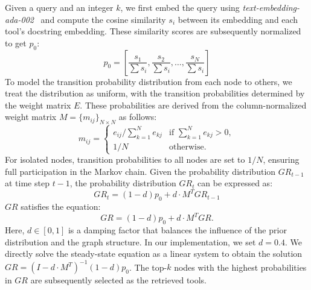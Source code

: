 Given a query and an integer $k$, we first embed the query using \textit{text-embedding-ada-002}~\citep{openai2022textembeddingada002} and compute the cosine similarity $s_i$ between its embedding and each tool’s docstring embedding. These similarity scores are subsequently normalized to get $p_0$:
\begin{equation}
p_0 = \left[ \frac{s_1}{\sum s_i}, \frac{s_2}{\sum s_i}, \dots, \frac{s_N}{\sum s_i} \right] 
\end{equation}
To model the transition probability distribution from each node to others, we treat the distribution as uniform, with the transition probabilities determined by the weight matrix $E$. These probabilities are derived from the column-normalized weight matrix $M=\{m_{ij}\}_{N\times N}$ as follows: 
\begin{equation}
m_{ij} =
\begin{cases}
e_{ij} / \sum_{k=1}^{N} e_{kj} & \text{if } \sum_{k=1}^{N} e_{kj} > 0, \\
1 /N & \text{otherwise}.
\end{cases}
\end{equation}
For isolated nodes, transition probabilities to all nodes are set to $1 / N$, ensuring full participation in the Markov chain. 
Given the probability distribution $GR_{t-1}$ at time step $t-1$, the probability distribution $GR_t$ can be expressed as:
\begin{equation}
    GR_t = (1 - d)p_0 + d \cdot {M}^T GR_{t-1}
\end{equation}
$GR$ satisfies the equation:
\vskip -0.1in
\begin{equation}
GR = (1 - d)p_0 + d \cdot {M}^T GR.
\end{equation}
Here, $d \in [0, 1]$ is a damping factor that balances the influence of the prior distribution and the graph structure. In our implementation, we set $d=0.4$. We directly solve the steady-state equation as a linear system to obtain the solution $GR = (I - d \cdot M^T)^{-1}(1-d)p_0$. The top-$k$ nodes with the highest probabilities in $GR$ are subsequently selected as the retrieved tools.

